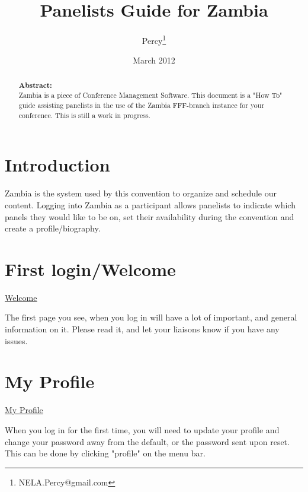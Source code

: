 \documentclass[captions=tablesignature]{scrartcl}
\author{Percy\thanks{NELA.Percy@gmail.com}}
\date{March 2012}
\title{Panelists Guide for Zambia}
\begin{document}
\maketitle
{}
\thispagestyle{fancy}
\renewcommand{\headrulewidth}{0pt}
\renewcommand{\footrulewidth}{0pt}
\lhead{}
\rhead{}
\chead{}
\lfoot{}
\cfoot{}
\rfoot{}
\begin{abstract}
\vspace{5cm}
{\LARGE{\textbf{Abstract:\\}}}
Zambia is a piece of Conference Management Software.  This document is a "How To" guide assisting panelists in the use of the Zambia FFF-branch instance for your conference.  This is still a work in progress.
\end{abstract}
\newpage
\renewcommand{\headrulewidth}{1pt}
\renewcommand{\footrulewidth}{1pt}
\rfoot{\thepage}
\setcounter{tocdepth}{3}
\tableofcontents
\newpage
{}
\section{Introduction}
\label{sec-1}

Zambia is the system used by this convention to organize and
schedule our content.  Logging into Zambia as a participant allows
panelists to indicate which panels they would like to be on, set
their availability during the convention and create a
profile/biography.

\section{First login/Welcome}
\label{sec-2}
\label{welcome.php}
\underline{
\href{../webpages/welcome.php}{Welcome}
}

The first page you see, when you log in will have a lot of
important, and general information on it.  Please read it, and let
your liaisons know if you have any issues.
\section{My Profile}
\label{sec-3}
\label{my_contact.php}
\underline{
\href{../webpages/my_contact.php}{My Profile}
}

When you log in for the first time, you will need to update your
profile and change your password away from the default, or the
password sent upon reset. This can be done by clicking "profile" on the menu bar.
\end{document}
